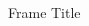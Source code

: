 \begin{frame}{Frame Title}
   \begin{columns}[T] %
     \begin{column}{.45\textwidth}
         
     \end{column}%
     \begin{column}{.45\textwidth}
        
     \end{column}%
   \end{columns}
\end{frame}